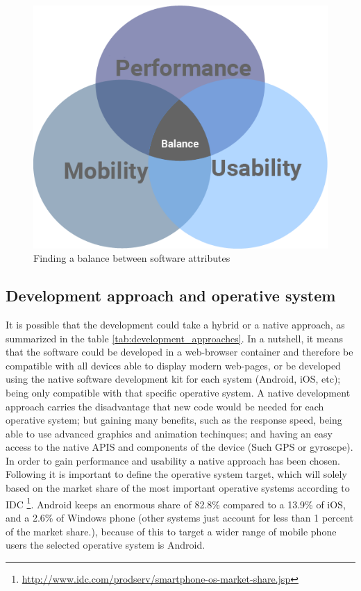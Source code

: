 \begin{figure}[H]
\begin{adjustbox}{width=.5\textwidth,center=\textwidth}
  \centering
  \includegraphics[scale=1]{images/balanceCircles.png}
\end{adjustbox}
  \caption[Finding a balance between software attributes]{Finding a balance between software attributes}
  \label{fig:balance_attributes}
\end{figure}

\subsection{Development approach and operative system}
It is possible that the development could take a hybrid or a native approach, as summarized in the table \ref{tab:development_approaches}. In a nutshell, it means that the software could be developed in a web-browser container and therefore be compatible with all devices able to display modern web-pages, or be developed using the native software development kit for each system (Android, iOS, etc); being only compatible with that specific operative system. A native development approach carries the disadvantage that new code would be needed for each operative system; but gaining many benefits, such as the response speed, being able to use advanced graphics and animation techinques; and having an easy access to the native APIS and components of the device (Such GPS or gyroscpe). In order to gain performance and usability a native approach has been chosen. Following it is important to define the operative system target, which will solely based on the market share of the most important operative systems according to IDC \footnote{\url{http://www.idc.com/prodserv/smartphone-os-market-share.jsp}}. Android keeps an enormous share of 82.8\% compared to a 13.9\% of iOS, and a 2.6\% of Windows phone (other systems just account for less than 1 percent of the market share.), because of this to target a wider range of mobile phone users the selected operative system is Android.

